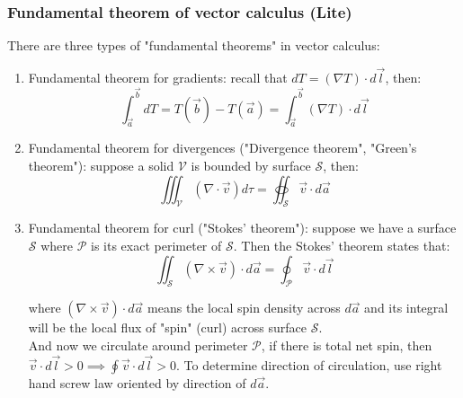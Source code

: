 \documentclass[12pt,a4paper,twoside]{article}
\begin{document}
	\subsubsection{Fundamental theorem of vector calculus (Lite)}
	There are three types of "fundamental theorems" in vector calculus:
	\begin{enumerate}
		\item Fundamental theorem for gradients: recall that \(dT=(\nabla T)\cdot d\overrightarrow{l}\), then:
		\begin{equation}
		    \int_{\overrightarrow{a}}^{\overrightarrow{b}}dT=T(\overrightarrow{b})-T(\overrightarrow{a})=\int_{\overrightarrow{a}}^{\overrightarrow{b}}(\nabla T)\cdot d\overrightarrow{l}
		    \label{eq:9}
		\end{equation}
		
		\item Fundamental theorem for divergences ("Divergence theorem", "Green's theorem"): suppose a solid \(\mathcal{V}\) is bounded by surface \(\mathcal{S}\), then:
		\begin{equation}
		    \iiint_{\mathcal{V}}(\nabla \cdot \overrightarrow{v})d\tau=\oiint_{\mathcal{S}}\overrightarrow{v}\cdot d\overrightarrow{a}
		    \label{eq:10}
		\end{equation}
		
		\item Fundamental theorem for curl ("Stokes' theorem"): suppose we have a surface \(\mathcal{S}\) where \(\mathcal{P}\) is its exact perimeter of \(\mathcal{S}\). Then the Stokes' theorem states that:
		\begin{equation}
		    \iint_{\mathcal{S}}(\nabla\times\overrightarrow{v})\cdot d\overrightarrow{a}=\oint_{\mathcal{P}}\overrightarrow{v}\cdot d\overrightarrow{l}
		    \label{eq:11}
		\end{equation}
		
		where \((\nabla \times \overrightarrow{v})\cdot d\overrightarrow{a}\) means the local spin density across \(d\overrightarrow{a}\) and its integral will be the local flux of "spin" (curl) across surface \(\mathcal{S}\).\\
		
		And now we circulate around perimeter \(\mathcal{P}\), if there is total net spin, then \(\overrightarrow{v}\cdot d\overrightarrow{l}>0\implies\oint\overrightarrow{v}\cdot d\overrightarrow{l}>0\). To determine direction of circulation, use right hand screw law oriented by direction of $d\overrightarrow{a}$.
	\end{enumerate}
	
\end{document}
